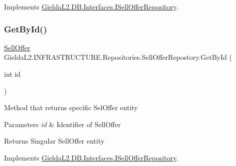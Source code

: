Implements \mbox{\hyperlink{interface_gielda_l2_1_1_d_b_1_1_interfaces_1_1_i_sell_offer_repository_a9d5a9662923804caeedb86878a8635f7}{Gielda\+L2.\+D\+B.\+Interfaces.\+I\+Sell\+Offer\+Repository}}.

\mbox{\label{class_gielda_l2_1_1_i_n_f_r_a_s_t_r_u_c_t_u_r_e_1_1_repositories_1_1_sell_offer_repostory_a66ee116572e1e4c959b50d3ad1c4698d}} 
\subsubsection{\texorpdfstring{GetById()}{GetById()}}
{\footnotesize\ttfamily \mbox{\hyperlink{class_gielda_l2_1_1_d_b_1_1_entities_1_1_sell_offer}{Sell\+Offer}} Gielda\+L2.\+I\+N\+F\+R\+A\+S\+T\+R\+U\+C\+T\+U\+R\+E.\+Repositories.\+Sell\+Offer\+Repostory.\+Get\+By\+Id (\begin{DoxyParamCaption}\item[{int}]{id }\end{DoxyParamCaption})}



Method that returns specific Sel\+Offer entity 


\begin{DoxyParams}{Parameters}
{\em id} & Identifier of Sell\+Offer\\
\hline
\end{DoxyParams}
\begin{DoxyReturn}{Returns}
Singular Sell\+Offer entity
\end{DoxyReturn}


Implements \mbox{\hyperlink{interface_gielda_l2_1_1_d_b_1_1_interfaces_1_1_i_sell_offer_repository_aded9f3b24232b67af3c898689fe5d3ac}{Gielda\+L2.\+D\+B.\+Interfaces.\+I\+Sell\+Offer\+Repository}}.

\mbox{\label{class_gielda_l2_1_1_i_n_f_r_a_s_t_r_u_c_t_u_r_e_1_1_repositories_1_1_sell_offer_repostory_aa00ce3d22fa6d090a5e40103fb202724}} 
